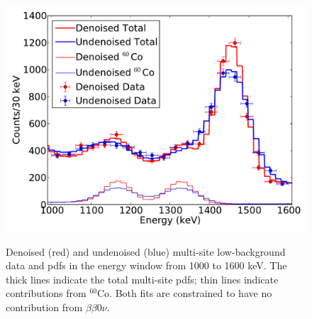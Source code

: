 \begin{figure}
\begin{center}
\includegraphics[keepaspectratio=true,width=\textwidth]{DenoisedVsUndenoised_TotalPdfsWithData_co60range_MS.pdf}
\end{center}
\renewcommand{\baselinestretch}{1}
\small\normalsize
\begin{quote}
\caption{Denoised (red) and undenoised (blue) multi-site low-background data and pdfs in the energy window from 1000 to 1600 keV.  The thick lines indicate the total multi-site pdfs; thin lines indicate contributions from $^{60}$Co.  Both fits are constrained to have no contribution from $\beta\beta 0\nu$.}
\label{fig:DenoisedComparison_Co60MS}
\end{quote}
\end{figure}
\renewcommand{\baselinestretch}{2}
\small\normalsize

